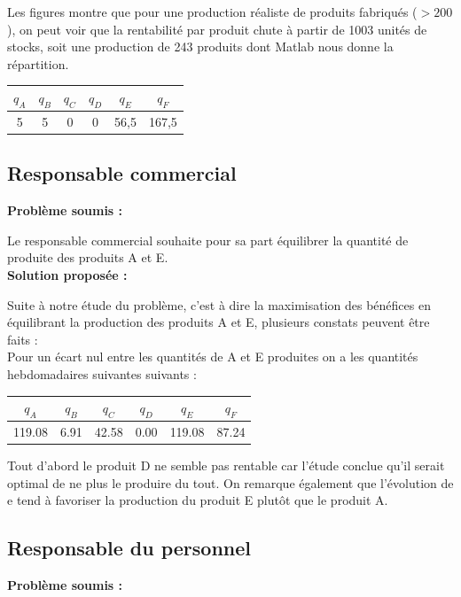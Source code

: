 \documentclass[paper=a4, fontsize=11pt]{scrartcl}
\numberwithin{equation}{section}		%
\numberwithin{figure}{section}			%
\numberwithin{table}{section}				%
\renewcommand{\bf}[1]{\textbf{#1}}
\begin{document}
Les figures montre que pour une production réaliste de produits fabriqués ($> 200$), on peut voir que la rentabilité par produit chute à partir de 1003 unités de stocks, soit une production de 243 produits dont Matlab nous donne la répartition.

\begin{center}
\begin{tabular}{cccccc}
\hline 
$q_A$ & $q_B$ & $q_C$ & $q_D$ & $q_E$ & $q_F$ \\ 
\hline 
5 & 5 & 0 & 0 & 56,5 & 167,5 \\ 
\hline 
\end{tabular} 
\end{center}



\subsection{Responsable commercial}
\bf{Problème soumis :}

Le responsable commercial souhaite pour sa part équilibrer la quantité de produite des produits A et E.\\

\bf{Solution proposée :}

Suite à notre étude du problème, c'est à dire la maximisation des bénéfices en équilibrant la production des produits A et E, plusieurs constats peuvent être faits :\\
Pour un écart nul entre les quantités de A et E produites on a les quantités hebdomadaires suivantes suivants :
\begin{center}
\begin{tabular}{cccccc}
\hline
$q_A$ & $q_B$ & $q_C$ & $q_D$ & $q_E$ & $q_F$ \\
\hline
119.08 & 6.91 & 42.58 & 0.00 & 119.08 & 87.24 \\
\hline
\end{tabular}
\end{center}
Tout d'abord le produit D ne semble pas rentable car l'étude conclue qu'il serait optimal de ne plus le produire du tout.
On remarque également que l’évolution de e tend à favoriser la production du produit E plutôt que le produit A.

\subsection{Responsable du personnel}
\bf{Problème soumis :}
\end{document}
